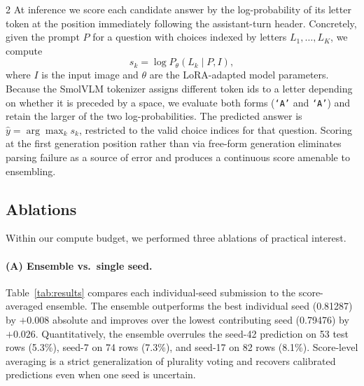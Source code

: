 \documentclass[11pt,a4paper]{article}
\begin{document}
\begin{multicols}{2}
At inference we score each candidate answer by the log-probability of its letter token at the position immediately following the assistant-turn header. Concretely, given the prompt $P$ for a question with choices indexed by letters $L_1, \dots, L_K$, we compute
\begin{equation}
s_k = \log P_\theta(L_k \mid P, I),
\end{equation}
where $I$ is the input image and $\theta$ are the LoRA-adapted model parameters. Because the SmolVLM tokenizer assigns different token ids to a letter depending on whether it is preceded by a space, we evaluate both forms (\texttt{`A'} and \texttt{`\textvisiblespace A'}) and retain the larger of the two log-probabilities. The predicted answer is $\hat{y} = \arg\max_k s_k$, restricted to the valid choice indices for that question. Scoring at the first generation position rather than via free-form generation eliminates parsing failure as a source of error and produces a continuous score amenable to ensembling.

\subsection{Ablations}

Within our compute budget, we performed three ablations of practical interest.

\paragraph{(A) Ensemble vs.\ single seed.} Table~\ref{tab:results} compares each individual-seed submission to the score-averaged ensemble. The ensemble outperforms the best individual seed (0.81287) by $+0.008$ absolute and improves over the lowest contributing seed (0.79476) by $+0.026$. Quantitatively, the ensemble overrules the seed-42 prediction on 53 test rows (5.3\%), seed-7 on 74 rows (7.3\%), and seed-17 on 82 rows (8.1\%). Score-level averaging is a strict generalization of plurality voting and recovers calibrated predictions even when one seed is uncertain.


\end{multicols}
\end{document}
